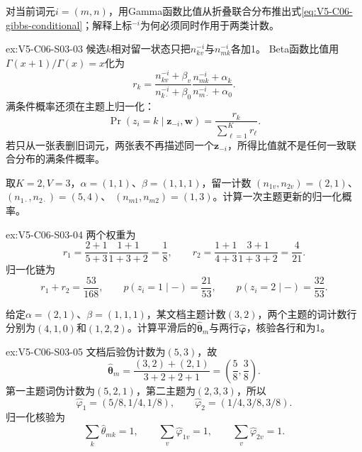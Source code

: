 \begin{SLChapterExercisePairSection}
\begin{exercise}\label{ex:V5-C06-S03-03}
对当前词元$i=(m,n)$，用Gamma函数比值从折叠联合分布推出式\eqref{eq:V5-C06-gibbs-conditional}；解释上标$^{-i}$为何必须同时作用于两类计数。
\end{exercise}
\ifSLFullEdition
{}\label{sol:V5-C06-S03-03}
\begin{chapterexercisesolution}{ex:V5-C06-S03-03}
\nopagebreak[4]
候选$k$相对留一状态只把$n_{kv}^{-i}$与$n_{mk}^{-i}$各加1。
Beta函数比值用$\Gamma(x+1)/\Gamma(x)=x$化为
\[
r_k=
\frac{n_{kv}^{-i}+\beta_v}{n_{k\cdot}^{-i}+\beta_0}
\frac{n_{mk}^{-i}+\alpha_k}{n_{m\cdot}^{-i}+\alpha_0}.
\]
满条件概率还须在主题上归一化：
\[
\Pr(z_i=k\mid\boldsymbol z_{-i},\boldsymbol w)
=\frac{r_k}{\sum_{\ell=1}^{K}r_\ell}.
\]
若只从一张表删旧词元，两张表不再描述同一个$\boldsymbol z_{-i}$，所得比值就不是任何一致联合分布的满条件概率。
\end{chapterexercisesolution}
\fi

\begin{exercise}\label{ex:V5-C06-S03-04}
取$K=2,V=3$，$\alpha=(1,1)$、$\beta=(1,1,1)$，留一计数
$(n_{1v},n_{2v})=(2,1)$、$(n_{1\cdot},n_{2\cdot})=(5,4)$、
$(n_{m1},n_{m2})=(1,3)$。计算一次主题更新的归一化概率。
\end{exercise}
\ifSLFullEdition
{}\label{sol:V5-C06-S03-04}
\begin{chapterexercisesolution}{ex:V5-C06-S03-04}
\nopagebreak[4]
两个权重为
\[
r_1=\frac{2+1}{5+3}\frac{1+1}{1+3+2}
=\frac18,
\qquad
r_2=\frac{1+1}{4+3}\frac{3+1}{1+3+2}
=\frac4{21}.
\]
归一化链为
\[
r_1+r_2=\frac{53}{168},\qquad
p(z_i=1\mid-)=\frac{21}{53},\qquad
p(z_i=2\mid-)=\frac{32}{53}.
\]
\end{chapterexercisesolution}
\fi

\begin{exercise}\label{ex:V5-C06-S03-05}
给定$\alpha=(2,1)$、$\beta=(1,1,1)$，某文档主题计数$(3,2)$，两个主题的词计数行分别为$(4,1,0)$和$(1,2,2)$。计算平滑后的$\widehat{\boldsymbol\theta}_m$与两行$\widehat{\boldsymbol\varphi}$，核验各行和为1。
\end{exercise}
\ifSLFullEdition
{}\label{sol:V5-C06-S03-05}
\begin{chapterexercisesolution}{ex:V5-C06-S03-05}
\nopagebreak[4]
文档后验伪计数为$(5,3)$，故
\[
\widehat{\boldsymbol\theta}_m
=\frac{(3,2)+(2,1)}{3+2+2+1}
=\left(\frac58,\frac38\right).
\]
第一主题词伪计数为$(5,2,1)$，第二主题为$(2,3,3)$，所以
\[
\widehat\varphi_1=(5/8,1/4,1/8),\qquad
\widehat\varphi_2=(1/4,3/8,3/8).
\]
归一化核验为
\[
\sum_k\widehat\theta_{mk}=1,\qquad
\sum_v\widehat\varphi_{1v}=1,\qquad
\sum_v\widehat\varphi_{2v}=1.
\]
\end{chapterexercisesolution}
\fi


\end{SLChapterExercisePairSection}
